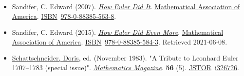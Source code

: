 \begin{itemize}
\item
  Sandifer, C. Edward (2007). \href{https://books.google.com/books?id=sohHs7ExOsYC}{\emph{How Euler Did It}}. \href{https://en.wikipedia.org/wiki/Mathematical_Association_of_America}{Mathematical Association of America}. \href{https://en.wikipedia.org/wiki/ISBN_(identifier)}{ISBN}{~}\href{https://en.wikipedia.org/wiki/Special:BookSources/978-0-88385-563-8}{978-0-88385-563-8}.{}
\item
  Sandifer, C. Edward (2015). \href{https://books.google.com/books?id=3c6iBQAAQBAJ}{\emph{How Euler Did Even More}}. \href{https://en.wikipedia.org/wiki/Mathematical_Association_of_America}{Mathematical Association of America}. \href{https://en.wikipedia.org/wiki/ISBN_(identifier)}{ISBN}{~}\href{https://en.wikipedia.org/wiki/Special:BookSources/978-0-88385-584-3}{978-0-88385-584-3}{. Retrieved {2021-06-08}}.{}
\item
  \href{https://en.wikipedia.org/wiki/Doris_Schattschneider}{Schattschneider, Doris}, ed. (November 1983). "A Tribute to Leonhard Euler 1707--1783 (special issue)". \emph{\href{https://en.wikipedia.org/wiki/Mathematics_Magazine}{Mathematics Magazine}}. \textbf{56} (5). \href{https://en.wikipedia.org/wiki/JSTOR_(identifier)}{JSTOR}{~}\href{https://www.jstor.org/stable/i326726}{i326726}.{}
\end{itemize}


